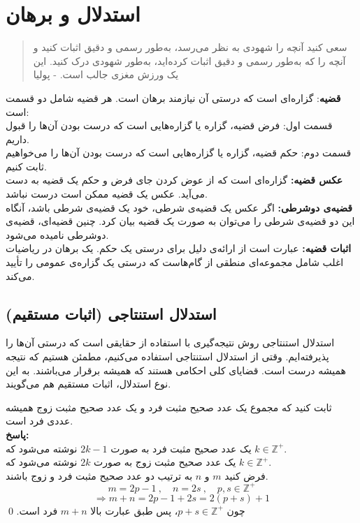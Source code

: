\chapter{استدلال و برهان}
\thispagestyle{empty}

\begin{quote}
	{\lotus
		سعی کنید آنچه را شهودی به نظر می‌رسد، به‌طور رسمی و دقیق اثبات کنید و آنچه را که به‌طور رسمی و دقیق اثبات کرده‌اید، به‌طور شهودی درک کنید. این یک ورزش مغزی جالب است. \quad - پولیا%
	}
\end{quote}

\noindent
\textbf{قضیه}:
گزاره‌ای است که درستی آن نیازمند برهان است. هر قضیه شامل دو قسمت است: \\
قسمت اول: فرض قضیه، گزاره یا گزاره‌هایی است که درست بودن آن‌ها را قبول داریم. \\
قسمت دوم: حکم قضیه، گزاره یا گزاره‌هایی است که درست بودن آن‌ها را می‌خواهیم ثابت کنیم.
\\
\textbf{عکس قضیه:}
گزاره‌ای است که از عوض کردن جای فرض و حکم یک قضیه به دست می‌آید. عکس یک قضیه ممکن است درست نباشد.
\\
\textbf{قضیه‌ی دوشرطی:}
اگر عکس یک قضیه‌ی شرطی، خود یک قضیه‌ی شرطی باشد، آنگاه این دو قضیه‌ی شرطی را می‌توان به صورت یک قضیه بیان کرد. چنین قضیه‌ای، قضیه‌ی دوشرطی نامیده می‌شود.
\\
\textbf{اثبات قضیه:}
عبارت است از ارائه‌ی دلیل برای درستی یک حکم. یک برهان در ریاضیات اغلب شامل مجموعه‌ای منطقی از گام‌هاست که درستی یک گزاره‌ی عمومی را تأیید می‌کند.

\section{استدلال استنتاجی (اثبات مستقیم)}
استدلال استنتاجی روش نتیجه‌گیری با استفاده از حقایقی است که درستی آن‌ها را پذیرفته‌ایم. وقتی از استدلال استنتاجی استفاده می‌کنیم، مطمئن هستیم که نتیجه همیشه درست است. قضایای کلی احکامی هستند که همیشه برقرار می‌باشند. به این نوع استدلال، اثبات مستقیم هم می‌گویند.

\begin{example}
	ثابت کنید که مجموع یک عدد صحیح مثبت فرد و یک عدد صحیح مثبت زوج همیشه عددی فرد است. \\
	\textbf{پاسخ:} \\
	یک عدد صحیح مثبت فرد به صورت
	$2k-1$
	نوشته می‌شود که
	$k \in \mathbb{Z}^+$. \\
	یک عدد صحیح مثبت زوج به صورت
	$2k$
	نوشته می‌شود که
	$k \in \mathbb{Z}^+$. \\
	فرض کنید $m$ و $n$ به ترتیب دو عدد صحیح مثبت فرد و زوج باشند.
	$$m=2p-1 \ , \quad n=2s \ , \quad p,s \in \mathbb{Z}^+$$
	$$\Rightarrow m+n=2p-1+2s=2(p+s)+1$$
	چون
	$p+s \in \mathbb{Z}^+$،
	پس طبق عبارت بالا
	$m+n$
	فرد است.
	\qed
\end{example}

